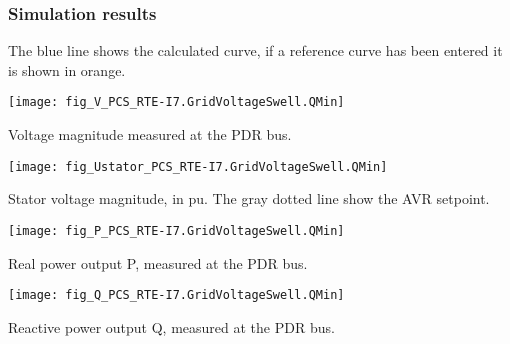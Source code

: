     \subsubsection{Simulation results}
    The blue line shows the calculated curve, if a reference curve has been entered it is
    shown in orange.

    \noindent
    \begin{minipage}[t]{0.48\textwidth}
        \centering
        \texttt{[image: fig\_V\_PCS\_RTE-I7.GridVoltageSwell.QMin]}
        \begin{minipage}[t]{0.8\textwidth}
            \small Voltage magnitude measured at the PDR bus.
        \end{minipage}
    \end{minipage}
    \hfill
    \begin{minipage}[t]{0.48\textwidth}
        \centering
        \texttt{[image: fig\_Ustator\_PCS\_RTE-I7.GridVoltageSwell.QMin]}
        \begin{minipage}[t]{0.8\textwidth}
            \small Stator voltage magnitude, in pu. The gray dotted line show
            the AVR setpoint.
        \end{minipage}
    \end{minipage}

    \vspace{0.5cm}

    \noindent
    \begin{minipage}[t]{0.48\textwidth}
        \centering
        \texttt{[image: fig\_P\_PCS\_RTE-I7.GridVoltageSwell.QMin]}
        \begin{minipage}[t]{0.8\textwidth}
            \small Real power output P, measured at the PDR bus.
        \end{minipage}
    \end{minipage}
    \hfill
    \begin{minipage}[t]{0.48\textwidth}
        \centering
        \texttt{[image: fig\_Q\_PCS\_RTE-I7.GridVoltageSwell.QMin]}
        \begin{minipage}[t]{0.8\textwidth}
            \small Reactive power output Q, measured at the PDR bus.
        \end{minipage}
    \end{minipage}

    \vspace{0.5cm}

